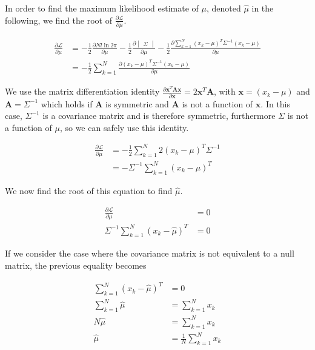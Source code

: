 \documentclass[a4paper, 10pt, twoside]{article}
\begin{document}
In order to find the maximum likelihood estimate of $\mu$, denoted $\hat{\mu}$ in the following, we find the root of $\frac{\partial \mathcal{L}}{\partial \mu}$.

\begin{align*}
    \frac{\partial \mathcal{L}}{\partial \mu}
     & =
    -\frac{1}{2} \frac{\partial{Nl \ln 2\pi}}{\partial \mu}
    -\frac{1}{2} \frac{\partial \begin{vmatrix} \Sigma \end{vmatrix}}{\partial \mu}
    -\frac{1}{2} \frac{\partial \sum_{k=1}^N (x_k-\mu)^T \Sigma^{-1} (x_k-\mu)}{\partial \mu} \\
     & =
    -\frac{1}{2} \sum_{k=1}^N \frac{\partial (x_k-\mu)^T \Sigma^{-1} (x_k-\mu)}{\partial \mu}
\end{align*}

We use the matrix differentiation identity $\frac{\partial \mathbf{x}^T\mathbf{Ax}}{\partial \mathbf{x}} = 2\mathbf{x}^T\mathbf{A}$, with $\mathbf{x} = (x_k-\mu)$ and $\mathbf{A} = \Sigma^{-1}$ which holds if $\mathbf{A}$ is symmetric and $\mathbf{A}$ is not a function of $\mathbf{x}$. In this case, $\Sigma^{-1}$ is a covariance matrix and is therefore symmetric, furthermore $\Sigma$ is not a function of $\mu$, so we can safely use this identity.

\begin{align*}
    \frac{\partial \mathcal{L}}{\partial \mu}
     & =
    -\frac{1}{2} \sum_{k=1}^N 2 (x_k-\mu)^T \Sigma^{-1} \\
     & =
    - \Sigma^{-1} \sum_{k=1}^N (x_k-\mu)^T
\end{align*}

We now find the root of this equation to find $\hat{\mu}$.

\begin{align*}
    \frac{\partial \mathcal{L}}{\partial \mu}  & = 0 \\
    \Sigma^{-1} \sum_{k=1}^N (x_k-\hat{\mu})^T & = 0
\end{align*}

If we consider the case where the covariance matrix is not equivalent to a null matrix, the previous equality becomes

\begin{align*}
    \sum_{k=1}^N (x_k-\hat{\mu})^T & = 0                            \\
    \sum_{k=1}^N\hat{\mu}          & = \sum_{k=1}^N x_k             \\
    N\hat{\mu}                     & = \sum_{k=1}^N x_k             \\
    \hat{\mu}                      & = \frac{1}{N} \sum_{k=1}^N x_k \\
\end{align*}
\end{document}
